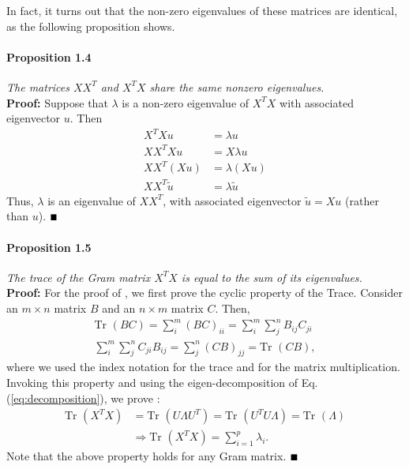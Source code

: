 \documentclass[12pt,letterpaper]{article}
\begin{document}
In fact, it turns out that the non-zero eigenvalues of these matrices are identical, as the following proposition shows.

\noindent
\paragraph{\bf Proposition 1.4}\label{par:prop1.4} \textit{The matrices $XX^T$ and $X^T X$ share the same nonzero eigenvalues.}
\\
{\bf Proof:}  Suppose that $\lambda$ is a non-zero eigenvalue of $X^TX$ with associated eigenvector $u$. Then
\begin{align}
X^T X u &= \lambda u\nonumber  \\
X X^T X u &=X \lambda u\nonumber  \\
X X^T (X u) &= \lambda (X u)\nonumber  \\
XX^T \tilde u &= \lambda \tilde u
\end{align}
Thus, $\lambda$ is  an eigenvalue of $X X^T$, with associated eigenvector $\tilde u = X u$ (rather than $u$).  $\hfill \blacksquare$

\paragraph{\bf Proposition 1.5}\label{par:prop1.5} \textit{The trace of the Gram matrix $X^TX$ is equal to the sum of its eigenvalues.}
\\
{\bf Proof:}  For the proof of , we first prove the cyclic property of the Trace. Consider an $m\times n$ matrix $B$ and an $n\times m$ matrix $C$. Then, 
\begin{align}
\text{Tr }(BC) = \sum_i^m(BC)_{ii}=\sum_i^m\sum_j^n B_{ij} C_{ji}\nonumber \\
 \sum_i^m\sum_j^n  C_{ji} B_{ij} = \sum_j^n (CB)_{jj} = \text{Tr }(CB),
\end{align}
where we used the index notation for the trace and for the matrix multiplication. Invoking this property and using the eigen-decomposition of Eq. (\ref{eq:decomposition}), we prove :
\begin{align}
\text{Tr }(X^T X) &= \text{Tr }(U\Lambda U^T) = \text{Tr }( U^TU\Lambda)=\text{Tr }( \Lambda)\nonumber \\
&\Rightarrow \text{Tr }(X^T X) = \sum_{i=1}^p \lambda_i.
\end{align}
Note that the above property holds for any Gram matrix. $\hfill \blacksquare$
\end{document}
